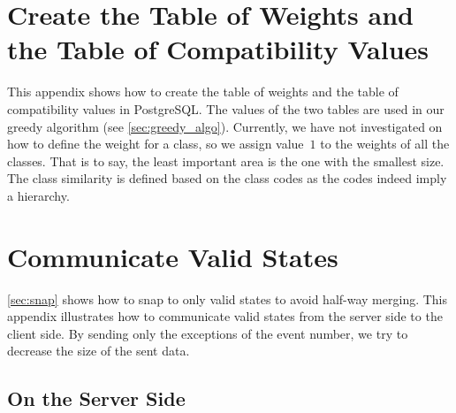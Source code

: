 \documentclass[]{interact}
\begin{document}






\appendix

\section{Create the Table of Weights and the Table of Compatibility Values}
\label{appx:create_tables}
This appendix shows how to create the table of weights and 
the table of compatibility values in PostgreSQL.
The values of the two tables are used in our greedy algorithm
(see \sect\ref{sec:greedy_algo}).
Currently, we have not investigated on 
how to define the weight for a class,
so we assign value~$1$ to the weights of all the classes.
That is to say, the least important area is the one with the smallest size.
The class similarity is defined based on the class codes 
as the codes indeed imply a hierarchy.

\bigskip



\bigskip

\section{Communicate Valid States}
\label{appx:communicate_valid_states}

\sect\ref{sec:snap} shows how to snap to only valid states 
to avoid half-way merging.
This appendix illustrates how to communicate valid states 
from the server side to the client side.
By sending only the exceptions of the event number, 
we try to decrease the size of the sent data.



\subsection{On the Server Side}
\label{sec:communicate_server}
\end{document}
